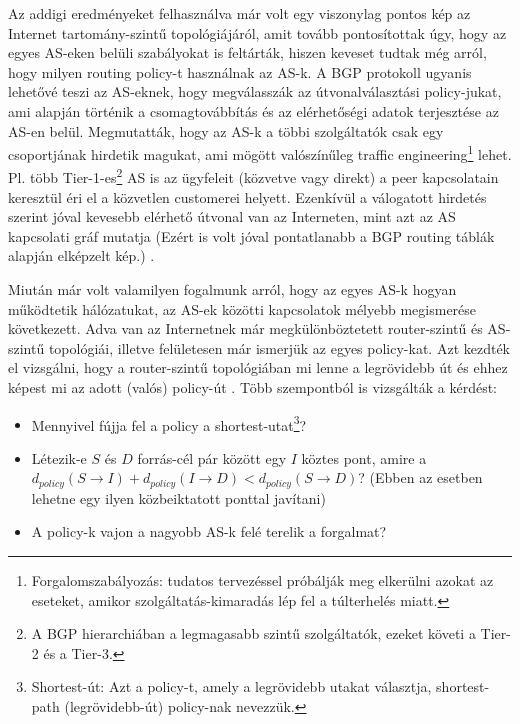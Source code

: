   Az addigi eredményeket felhasználva már volt egy viszonylag pontos kép az Internet tartomány-szintű topológiájáról, amit tovább pontosítottak úgy, hogy az egyes AS-eken belüli szabályokat is feltárták, hiszen keveset tudtak még arról, hogy milyen routing policy-t használnak az AS-k. A BGP protokoll ugyanis lehetővé teszi az AS-eknek, hogy megválasszák az útvonalválasztási policy-jukat, ami alapján történik a csomagtovábbítás és az elérhetőségi adatok terjesztése az AS-en belül. Megmutatták, hogy az AS-k a többi szolgáltatók csak egy csoportjának hirdetik magukat, ami mögött valószínűleg traffic engineering\footnote{Forgalomszabályozás: tudatos tervezéssel próbálják meg elkerülni azokat az eseteket, amikor szolgáltatás-kimaradás lép fel a túlterhelés miatt.} lehet. Pl. több Tier-1-es\footnote{A BGP hierarchiában a legmagasabb szintű szolgáltatók, ezeket követi a Tier-2 és a Tier-3.} AS is az ügyfeleit (közvetve vagy direkt) a peer kapcsolatain keresztül éri el a közvetlen customerei helyett. Ezenkívül a válogatott hirdetés szerint jóval kevesebb elérhető útvonal van az Interneten, mint azt az AS kapcsolati gráf mutatja (Ezért is volt jóval pontatlanabb a BGP routing táblák alapján elképzelt kép.) \cite{On_Inferring_and_Characterizing_Internet_Routing_Policies}.

  Miután már volt valamilyen fogalmunk arról, hogy az egyes AS-k hogyan működtetik hálózatukat, az AS-ek közötti kapcsolatok mélyebb megismerése következett. Adva van az Internetnek már megkülönböztetett router-szintű és AS-szintű topológiái, illetve felületesen már ismerjük az egyes policy-kat. Azt kezdték el vizsgálni, hogy a router-szintű topológiában mi lenne a legrövidebb út és ehhez képest mi az adott (valós) policy-út \cite{The_Impact_of_Routing_Policy_on_Internet_Paths}. Több szempontból is vizsgálták a kérdést:
  \begin{itemize}
    \item Mennyivel fújja fel a policy a shortest-utat\footnote{Shortest-út: Azt a policy-t, amely a legrövidebb utakat választja, shortest-path (legrövidebb-út) policy-nak nevezzük.}?
    \item Létezik-e $S$ és $D$ forrás-cél pár között egy $I$ köztes pont, amire a $d_{policy}( S \rightarrow I ) + d_{policy}( I \rightarrow D ) < d_{policy}( S \rightarrow D )$? (Ebben az esetben lehetne egy ilyen közbeiktatott ponttal javítani)
    \item A policy-k vajon a nagyobb AS-k felé terelik a forgalmat?
  \end{itemize}

